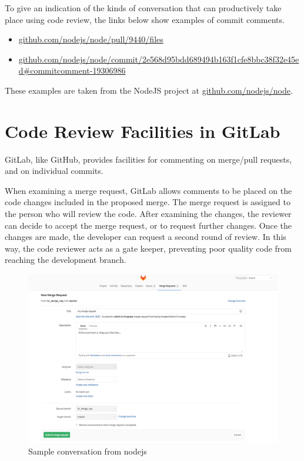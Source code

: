 \documentclass[
]{book}
\providecommand{\tightlist}{%
  \setlength{\itemsep}{0pt}\setlength{\parskip}{0pt}}
\begin{document}
To give an indication of the kinds of conversation that can productively take place using code review, the links below show examples of commit comments.

\begin{itemize}
\tightlist
\item
  \href{https://github.com/nodejs/node/pull/9440/files}{github.com/nodejs/node/pull/9440/files}
\item
  \href{https://github.com/nodejs/node/commit/2e568d95bdd689494b163f1cfe8bbc38f32e45ed\#commitcomment-19306986}{github.com/nodejs/node/commit/2e568d95bdd689494b163f1cfe8bbc38f32e45ed\#commitcomment-19306986}
\end{itemize}

These examples are taken from the NodeJS project at \href{https://github.com/nodejs/node}{github.com/nodejs/node}.

\hypertarget{gitlabrev}{%
\section{Code Review Facilities in GitLab}\label{gitlabrev}}

GitLab, like GitHub, provides facilities for commenting on merge/pull requests, and on individual commits.

When examining a merge request, GitLab allows comments to be placed on the code changes included in the proposed merge. The merge request is assigned to the person who will review the code. After examining the changes, the reviewer can decide to accept the merge request, or to request further changes. Once the changes are made, the developer can request a second round of review. In this way, the code reviewer acts as a gate keeper, preventing poor quality code from reaching the development branch.

\begin{figure}

{\centering \includegraphics[width=1\linewidth]{images/merge_request_assignee} 

}

\caption{Sample conversation from nodejs}\label{fig:merge-request-assignee-fig}
\end{figure}
\end{document}
